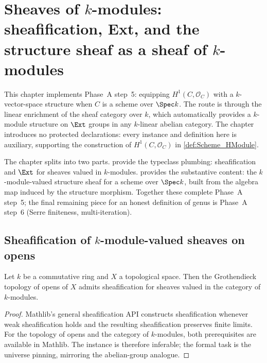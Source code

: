 \chapter{Sheaves of \(k\)-modules: sheafification, Ext, and the structure sheaf as a sheaf of \(k\)-modules}
\label{chap:Cohomology_StructureSheafModuleK}

This chapter implements Phase~A step~5: equipping \(H^1(C, \mathcal O_C)\) with a \(k\)-vector-space structure when \(C\) is a scheme over \(\Spec k\). The route is through the linear enrichment of the sheaf category over \(k\), which automatically provides a \(k\)-module structure on \(\Ext\) groups in any \(k\)-linear abelian category. The chapter introduces no protected declarations: every instance and definition here is auxiliary, supporting the construction of \(H^1(C, \mathcal O_C)\) in \cref{def:Scheme_HModule}.

The chapter splits into two parts.  provide the typeclass plumbing: sheafification and \(\Ext\) for sheaves valued in \(k\)-modules.  provides the substantive content: the \(k\)-module-valued structure sheaf for a scheme over \(\Spec k\), built from the algebra map induced by the structure morphism. Together these complete Phase~A step~5; the final remaining piece for an honest definition of genus is Phase~A step~6 (Serre finiteness, multi-iteration).

\section{Sheafification of \(k\)-module-valued sheaves on opens}
\label{sec:moduleK_prereqs}

\begin{theorem}
  \label{thm:HasSheafify_Opens_ModuleCatK}
  Let \(k\) be a commutative ring and \(X\) a topological space. Then the Grothendieck topology of opens of \(X\) admits sheafification for sheaves valued in the category of \(k\)-modules.
\end{theorem}

\begin{proof}

\leanok
  Mathlib's general sheafification API constructs sheafification whenever weak sheafification holds and the resulting sheafification preserves finite limits. For the topology of opens and the category of \(k\)-modules, both prerequisites are available in Mathlib. The instance is therefore inferable; the formal task is the universe pinning, mirroring the abelian-group analogue.
\end{proof}

